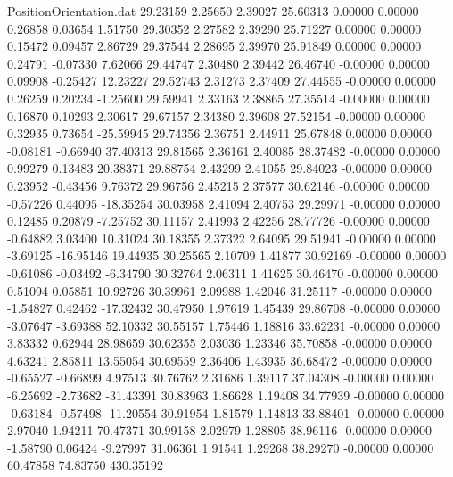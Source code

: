 \begin{filecontents}{PositionOrientation.dat}
  29.23159    2.25650    2.39027    25.60313    0.00000    0.00000    0.26858    0.03654    1.51750
  29.30352    2.27582    2.39290    25.71227    0.00000    0.00000    0.15472    0.09457    2.86729
  29.37544    2.28695    2.39970    25.91849    0.00000    0.00000    0.24791   -0.07330    7.62066
  29.44747    2.30480    2.39442    26.46740   -0.00000    0.00000    0.09908   -0.25427   12.23227
  29.52743    2.31273    2.37409    27.44555   -0.00000    0.00000    0.26259    0.20234   -1.25600
  29.59941    2.33163    2.38865    27.35514   -0.00000    0.00000    0.16870    0.10293    2.30617
  29.67157    2.34380    2.39608    27.52154   -0.00000    0.00000    0.32935    0.73654  -25.59945
  29.74356    2.36751    2.44911    25.67848    0.00000    0.00000   -0.08181   -0.66940   37.40313
  29.81565    2.36161    2.40085    28.37482   -0.00000    0.00000    0.99279    0.13483   20.38371
  29.88754    2.43299    2.41055    29.84023   -0.00000    0.00000    0.23952   -0.43456    9.76372
  29.96756    2.45215    2.37577    30.62146   -0.00000    0.00000   -0.57226    0.44095  -18.35254
  30.03958    2.41094    2.40753    29.29971   -0.00000    0.00000    0.12485    0.20879   -7.25752
  30.11157    2.41993    2.42256    28.77726   -0.00000    0.00000   -0.64882    3.03400   10.31024
  30.18355    2.37322    2.64095    29.51941   -0.00000    0.00000   -3.69125  -16.95146   19.44935
  30.25565    2.10709    1.41877    30.92169   -0.00000    0.00000   -0.61086   -0.03492   -6.34790
  30.32764    2.06311    1.41625    30.46470   -0.00000    0.00000    0.51094    0.05851   10.92726
  30.39961    2.09988    1.42046    31.25117   -0.00000    0.00000   -1.54827    0.42462  -17.32432
  30.47950    1.97619    1.45439    29.86708   -0.00000    0.00000   -3.07647   -3.69388   52.10332
  30.55157    1.75446    1.18816    33.62231   -0.00000    0.00000    3.83332    0.62944   28.98659
  30.62355    2.03036    1.23346    35.70858   -0.00000    0.00000    4.63241    2.85811   13.55054
  30.69559    2.36406    1.43935    36.68472   -0.00000    0.00000   -0.65527   -0.66899    4.97513
  30.76762    2.31686    1.39117    37.04308   -0.00000    0.00000   -6.25692   -2.73682  -31.43391
  30.83963    1.86628    1.19408    34.77939   -0.00000    0.00000   -0.63184   -0.57498  -11.20554
  30.91954    1.81579    1.14813    33.88401   -0.00000    0.00000    2.97040    1.94211   70.47371
  30.99158    2.02979    1.28805    38.96116   -0.00000    0.00000   -1.58790    0.06424   -9.27997
  31.06361    1.91541    1.29268    38.29270   -0.00000    0.00000   60.47858   74.83750  430.35192

\end{filecontents}
